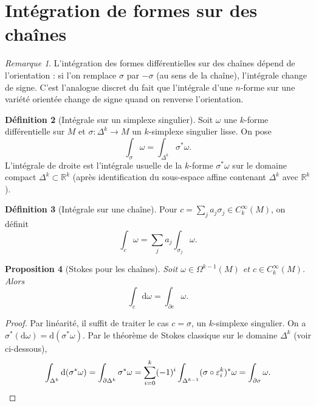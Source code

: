 \documentclass[12pt,a4paper,openany]{book}
\theoremstyle{definition}
\newtheorem{definition}{Définition}[chapter]
\theoremstyle{plain}
\newtheorem{proposition}[definition]{Proposition}
\theoremstyle{remark}
\newtheorem{remarque}[definition]{Remarque}
\newcommand{\R}{\mathbb{R}}
\newcommand{\dd}{\mathrm{d}}
\begin{document}
\section{Intégration de formes sur des chaînes}\label{sec:integration-chaines}

\begin{remarque}\label{rem:integration-orientation}
L'intégration des formes différentielles sur des chaînes dépend de l'orientation :
si l'on remplace $\sigma$ par $-\sigma$ (au sens de la chaîne), l'intégrale change
de signe. C'est l'analogue discret du fait que l'intégrale d'une $n$-forme sur une
variété orientée change de signe quand on renverse l'orientation.
\end{remarque}

\begin{definition}[Intégrale sur un simplexe singulier]\label{def:int-simplexe}
Soit $\omega$ une $k$-forme différentielle sur $M$ et
$\sigma \colon \Delta^k \to M$ un $k$-simplexe singulier lisse. On pose
\[
  \int_\sigma \omega = \int_{\Delta^k} \sigma^*\omega.
\]
L'intégrale de droite est l'intégrale usuelle de la $k$-forme $\sigma^*\omega$
sur le domaine compact $\Delta^k \subset \R^k$ (après identification du
sous-espace affine contenant $\Delta^k$ avec $\R^k$).
\end{definition}

\begin{definition}[Intégrale sur une chaîne]\label{def:int-chaine}
Pour $c = \sum_j a_j \sigma_j \in C_k^\infty(M)$, on définit
\[
  \int_c \omega = \sum_j a_j \int_{\sigma_j} \omega.
\]
\end{definition}

\begin{proposition}[Stokes pour les chaînes]\label{prop:stokes-chaines}
Soit $\omega \in \Omega^{k-1}(M)$ et $c \in C_k^\infty(M)$. Alors
\[
  \int_c \dd\omega = \int_{\partial c} \omega.
\]
\end{proposition}

\begin{proof}
Par linéarité, il suffit de traiter le cas $c = \sigma$, un $k$-simplexe
singulier. On a $\sigma^*(\dd\omega) = \dd(\sigma^*\omega)$. Par le
théorème de Stokes classique sur le domaine $\Delta^k$ (voir ci-dessous),
\[
  \int_{\Delta^k} \dd(\sigma^*\omega) = \int_{\partial\Delta^k} \sigma^*\omega
  = \sum_{i=0}^{k}(-1)^i \int_{\Delta^{k-1}}(\sigma\circ\varepsilon_i^k)^*\omega
  = \int_{\partial\sigma}\omega. \qedhere
\]
\end{proof}
\end{document}
